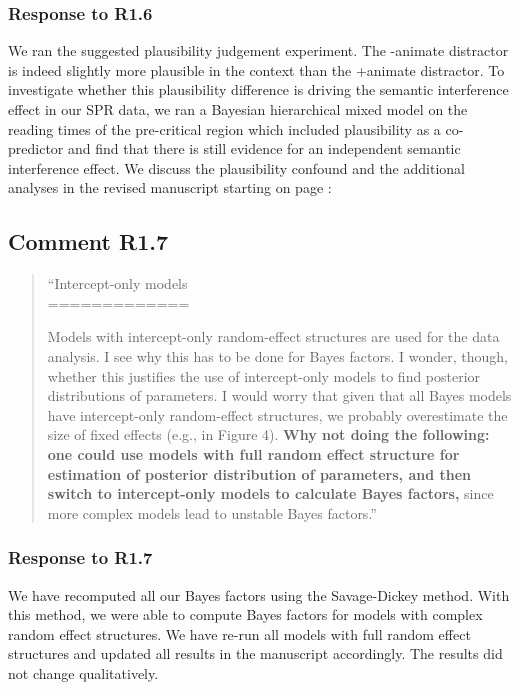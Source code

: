 \documentclass[12pt]{article}
\begin{document}
\subsubsection*{Response to R1.6}
We ran the suggested plausibility judgement experiment. The -animate distractor is indeed slightly more plausible in the context than the +animate distractor. To investigate whether this plausibility difference is driving the semantic interference effect in our SPR data, we ran a Bayesian hierarchical mixed model on the reading times of the pre-critical region which included plausibility as a co-predictor and find that there is still evidence for an independent semantic interference effect. We discuss the plausibility confound and the additional analyses in the revised manuscript starting on page \pageref{plausib_anim_inan}:

\setcounter{figure}{5}

\begin{quote}
\end{quote}

\newpage

\subsection*{Comment R1.7}
\begin{quote}
``Intercept-only models\\
=============

Models with intercept-only random-effect structures are used for the data analysis. I see why this has to be done for Bayes factors. I wonder, though, whether this justifies the use of intercept-only models to find posterior distributions of parameters. I would worry that given that all Bayes models have intercept-only random-effect structures, we probably overestimate the size of fixed effects (e.g., in Figure 4). \textbf{Why not doing the following: one could use models with full random effect structure for estimation of posterior distribution of parameters, and then switch to intercept-only models to calculate Bayes factors,} since more complex models lead to unstable Bayes factors.''\end{quote}


\subsubsection*{Response to R1.7}
We have recomputed all our Bayes factors using the Savage-Dickey method. With this method, we were able to compute Bayes factors for models with complex random effect structures. We have re-run all models with full random effect structures and updated all results in the manuscript accordingly. The results did not change qualitatively.
\end{document}
